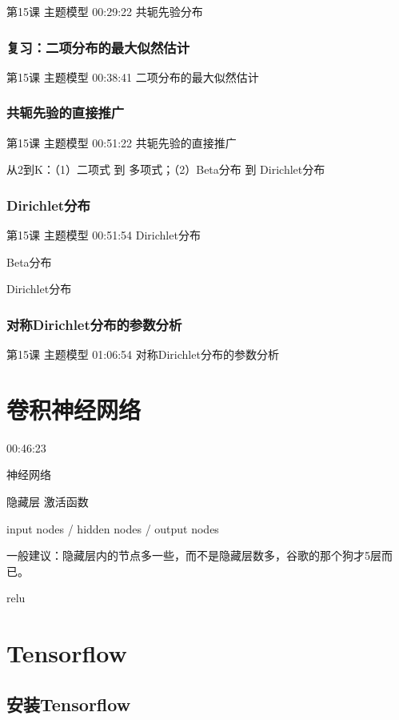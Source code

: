 \documentclass[UTF8]{ctexart}
\begin{document}
第15课 主题模型 00:29:22 共轭先验分布

\subsubsection{复习：二项分布的最大似然估计}

第15课 主题模型 00:38:41 二项分布的最大似然估计

\subsubsection{共轭先验的直接推广}

第15课 主题模型 00:51:22 共轭先验的直接推广

从2到K：（1）二项式   到  多项式；（2）Beta分布 到 Dirichlet分布

\subsubsection{Dirichlet分布}

第15课 主题模型 00:51:54 Dirichlet分布

Beta分布

 Dirichlet分布

\subsubsection{对称Dirichlet分布的参数分析}

第15课 主题模型 01:06:54 对称Dirichlet分布的参数分析




\section{卷积神经网络}

00:46:23

神经网络

隐藏层 激活函数

input nodes / hidden nodes / output nodes

一般建议：隐藏层内的节点多一些，而不是隐藏层数多，谷歌的那个狗才5层而已。

relu

\section{Tensorflow}

\subsection{安装Tensorflow}
\end{document}
